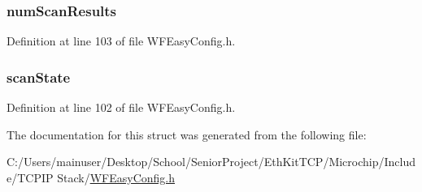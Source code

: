 \hypertarget{structt_w_f_scan_ctx_a8e94e023d6efb11536a80d53f659b9f5}{}
\subsubsection[{num\+Scan\+Results}]{ num\+Scan\+Results}\label{structt_w_f_scan_ctx_a8e94e023d6efb11536a80d53f659b9f5}


Definition at line 103 of file W\+F\+Easy\+Config.\+h.

\hypertarget{structt_w_f_scan_ctx_a06d254e47e877e10e34f120bcaec1940}{}
\subsubsection[{scan\+State}]{ scan\+State}\label{structt_w_f_scan_ctx_a06d254e47e877e10e34f120bcaec1940}


Definition at line 102 of file W\+F\+Easy\+Config.\+h.



The documentation for this struct was generated from the following file\+:\begin{DoxyCompactItemize}
\item 
C\+:/\+Users/mainuser/\+Desktop/\+School/\+Senior\+Project/\+Eth\+Kit\+T\+C\+P/\+Microchip/\+Include/\+T\+C\+P\+I\+P Stack/\hyperlink{_w_f_easy_config_8h}{W\+F\+Easy\+Config.\+h}\end{DoxyCompactItemize}
